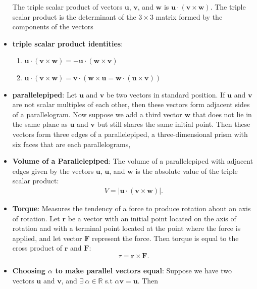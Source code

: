 \documentclass{report}
\begin{document}
\begin{itemize}
            The triple scalar product of vectors $\mathbf{u}$, $\mathbf{v}$, and $\mathbf{w}$ is $\mathbf{u} \cdot (\mathbf{v} \times \mathbf{w})$.
            \bigbreak \noindent 
            The triple scalar product is the determinant of the  $3\times 3$ matrix formed by the components of the vectors
        \item \textbf{triple scalar product identities}: 
            \begin{enumerate}[label=(\alph*)]
                \item $\mathbf{u} \cdot (\mathbf{v} \times \mathbf{w}) = -\mathbf{u} \cdot (\mathbf{w} \times \mathbf{v})$
                \item $\mathbf{u} \cdot (\mathbf{v} \times \mathbf{w}) = \mathbf{v} \cdot (\mathbf{w} \times \mathbf{u} = \mathbf{w} \cdot (\mathbf{u} \times \mathbf{v}))$
            \end{enumerate}
            \pagebreak 
        \item \textbf{parallelepiped}: Let $\mathbf{u}$ and $\mathbf{v}$ be two vectors in standard position. If $\mathbf{u}$ and $\mathbf{v}$ are not scalar multiples of each other, then these vectors form adjacent sides of a parallelogram.
            \bigbreak \noindent 
            Now suppose we add a third vector  $\mathbf{w}$ that does not lie in the same plane as  $\mathbf{u}$ and  $\mathbf{v}$ but still shares the same initial point. Then these vectors form three edges of a parallelepiped, a three-dimensional prism with six faces that are each parallelograms,
        \item \textbf{Volume of a Parallelepiped}:
            The volume of a parallelepiped with adjacent edges given by the vectors  $\mathbf{u}$, $\mathbf{u}$, and $\mathbf{w}$ is the absolute value of the triple scalar product:
            \begin{align*}
                V = \bigg\lvert \mathbf{u} \cdot (\mathbf{v} \times \mathbf{w}) \bigg\rvert
            .\end{align*}
        \item \textbf{Torque}:
            Measures the tendency of a force to produce rotation about an axis of rotation. Let $\mathbf{r}$ be a vector with an initial point located on the axis of rotation and with a terminal point located at the point where the force is applied, and let vector $\mathbf{F}$ represent the force. Then torque is equal to the cross product of $\mathbf{r}$ and $\mathbf{F}$:
            $$
            \tau = \mathbf{r} \times \mathbf{F}.
            $$
        \item \textbf{Choosing $\alpha$ to make parallel vectors equal}: Suppose we have two vectors $\mathbf{u}$ and $\mathbf{v}$, and $\exists\ \alpha \in \mathbb{R}$ s.t $\alpha \mathbf{v} = \mathbf{u}$. Then 

\end{itemize}
\end{document}
